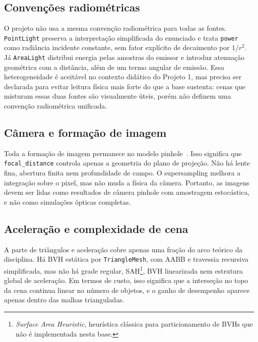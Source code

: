 \documentclass[portuguese]{sbcreviews-2025}%
\makeatletter
\newcommand{\slideurl}[1]{%
    \ifcsname slideurl@#1\endcsname
        \csname slideurl@#1\endcsname
    \else
        #1
    \fi
}
\newcommand{\slidescite}[2]{\citep[\href{\slideurl{#1}}{pp.~#2}]{#1}}
\makeatother
\begin{document}
\subsection{Convenções radiométricas}
\label{sec:lim-radiometria-v3}

O projeto não usa a mesma convenção radiométrica para todas as fontes. \texttt{PointLight} preserva a interpretação simplificada do enunciado e trata \texttt{power} como radiância incidente constante, sem fator explícito de decaimento por \(1/r^2\). Já \texttt{AreaLight} distribui energia pelas amostras do emissor e introduz atenuação geométrica com a distância, além de um termo angular de emissão. Essa heterogeneidade é aceitável no contexto didático do Projeto 1, mas precisa ser declarada para evitar leitura física mais forte do que a base sustenta: cenas que misturam essas duas fontes são visualmente úteis, porém não definem uma convenção radiométrica unificada.

\subsection{Câmera e formação de imagem}
\label{sec:lim-camera-v3}

Toda a formação de imagem permanece no modelo pinhole~\slidescite{inf2608slides04}{19--39}. Isso significa que \texttt{focal\_distance} controla apenas a geometria do plano de projeção. Não há lente fina, abertura finita nem profundidade de campo. O supersampling melhora a integração sobre o pixel, mas não muda a física da câmera. Portanto, as imagens devem ser lidas como resultados de câmera pinhole com amostragem estocástica, e não como simulações ópticas completas.

\subsection{Aceleração e complexidade de cena}
\label{sec:lim-aceleracao-v3}

A parte de triângulos e aceleração cobre apenas uma fração do arco teórico da disciplina. Há BVH estática por \texttt{TriangleMesh}, com AABB e travessia recursiva simplificada, mas não há grade regular, SAH\footnote{\emph{Surface Area Heuristic}, heurística clássica para particionamento de BVHs que não é implementada nesta base.}, BVH linearizada nem estrutura global de aceleração. Em termos de custo, isso significa que a interseção no topo da cena continua linear no número de objetos, e o ganho de desempenho aparece apenas dentro das malhas trianguladas.
\end{document}
